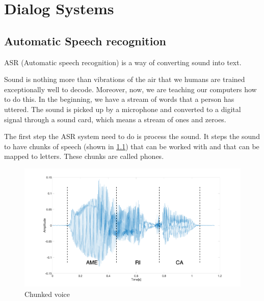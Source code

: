 \chapter{Dialog Systems} \label{chap:dialog_systems}



\section{Automatic Speech recognition}

ASR (Automatic speech recognition) is a way of converting sound into text. 

Sound is nothing more than vibrations of the air that we humans are trained exceptionally well to decode. Moreover, now, we are teaching our computers how to do this. In the beginning, we have a stream of words that a person has uttered. The sound is picked up by a microphone and converted to a digital signal through a sound card, which means a stream of ones and zeroes.

The first step the ASR system need to do is process the sound. It steps the sound to have chunks of speech (shown in \cref{fig:chunked_voice}) that can be worked with and that can be mapped to letters. These chunks are called phones. 

\begin{figure}[H]
    \centering
    \includegraphics[width=\textwidth]{img/voice_edit.png}
    \caption{Chunked voice}
    \label{fig:chunked_voice}
\end{figure}

